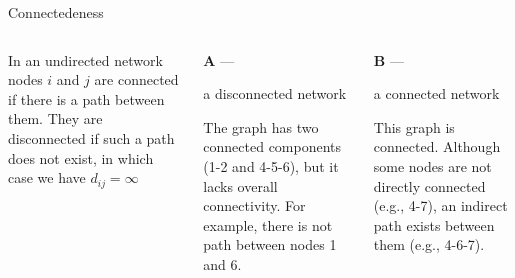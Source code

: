 \documentclass[notes, aspectratio=1610]{beamer}
\begin{document}
\begin{frame}{Connectedeness}
	\begin{columns}
		\begin{column}{0.33\textwidth}
			In an undirected network nodes $i$ and $j$ are connected if
			there is a path between them. They are disconnected if
			such a path does not exist, in which case we have $d_{ij} = \infty$
		
		\end{column}
		\begin{column}{0.33\textwidth}

			\begin{center}

			\textbf{A} ---
			
			a disconnected network

			\vspace{1em}

			

			\end{center}

			\begin{footnotesize}
			The graph has two connected components (1-2 and 4-5-6),
			but it lacks overall connectivity. For example, there is
			not path between nodes 1 and 6.
			\end{footnotesize}

		\end{column}
		\begin{column}{0.33\textwidth}
			\begin{center}

			\textbf{B} ---
			
			a connected network

			\vspace{1em}

			

			\end{center}

			\begin{footnotesize}
			This graph is connected. Although 
			some nodes are not directly connected (e.g., 4-7), 
			an indirect path exists between them (e.g., 4-6-7). 
			\end{footnotesize}
			
		\end{column}
	\end{columns}
\end{frame}
\end{document}
